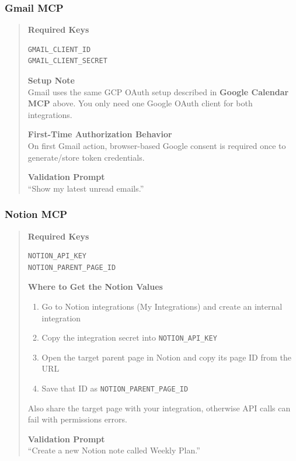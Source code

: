 \documentclass{article}
\begin{document}
\subsubsection{Gmail MCP}
\begin{quote}
\noindent\textbf{Required Keys}
\begin{verbatim}
GMAIL_CLIENT_ID
GMAIL_CLIENT_SECRET
\end{verbatim}

\noindent\textbf{Setup Note}\\
Gmail uses the same GCP OAuth setup described in \textbf{Google Calendar MCP} above. You only need one Google OAuth client for both integrations.

\medskip
\noindent\textbf{First-Time Authorization Behavior}\\
On first Gmail action, browser-based Google consent is required once to generate/store token credentials.

\medskip
\noindent\textbf{Validation Prompt}\\
``Show my latest unread emails.''
\end{quote}

\subsubsection{Notion MCP}
\begin{quote}
\noindent\textbf{Required Keys}
\begin{verbatim}
NOTION_API_KEY
NOTION_PARENT_PAGE_ID
\end{verbatim}

\noindent\textbf{Where to Get the Notion Values}
\begin{enumerate}
	\item Go to Notion integrations (My Integrations) and create an internal integration
	\item Copy the integration secret into \texttt{NOTION\_API\_KEY}
	\item Open the target parent page in Notion and copy its page ID from the URL
	\item Save that ID as \texttt{NOTION\_PARENT\_PAGE\_ID}
\end{enumerate}

Also share the target page with your integration, otherwise API calls can fail with permissions errors.

\medskip
\noindent\textbf{Validation Prompt}\\
``Create a new Notion note called Weekly Plan.''
\end{quote}
\end{document}

